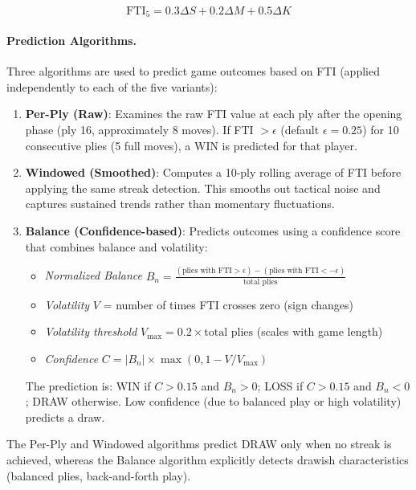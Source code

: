 \documentclass[11pt]{book}
\begin{document}
\begin{equation}
\text{FTI}_5 = 0.3 \Delta S + 0.2 \Delta M + 0.5 \Delta K
\end{equation}

\paragraph{Prediction Algorithms.} Three algorithms are used to predict game outcomes based on FTI (applied independently to each of the five variants):

\begin{enumerate}
\item \textbf{Per-Ply (Raw)}: Examines the raw FTI value at each ply after the opening phase (ply 16, approximately 8 moves). If FTI $> \epsilon$ (default $\epsilon = 0.25$) for 10 consecutive plies (5 full moves), a WIN is predicted for that player.

\item \textbf{Windowed (Smoothed)}: Computes a 10-ply rolling average of FTI before applying the same streak detection. This smooths out tactical noise and captures sustained trends rather than momentary fluctuations.

\item \textbf{Balance (Confidence-based)}: Predicts outcomes using a confidence score that combines balance and volatility:
\begin{itemize}
\item \emph{Normalized Balance} $B_n = \frac{(\text{plies with FTI} > \epsilon) - (\text{plies with FTI} < -\epsilon)}{\text{total plies}}$
\item \emph{Volatility} $V$ = number of times FTI crosses zero (sign changes)
\item \emph{Volatility threshold} $V_{\max} = 0.2 \times \text{total plies}$ (scales with game length)
\item \emph{Confidence} $C = |B_n| \times \max(0, 1 - V/V_{\max})$
\end{itemize}
The prediction is: WIN if $C > 0.15$ and $B_n > 0$; LOSS if $C > 0.15$ and $B_n < 0$; DRAW otherwise. Low confidence (due to balanced play or high volatility) predicts a draw.
\end{enumerate}

The Per-Ply and Windowed algorithms predict DRAW only when no streak is achieved, whereas the Balance algorithm explicitly detects drawish characteristics (balanced plies, back-and-forth play).
\end{document}
